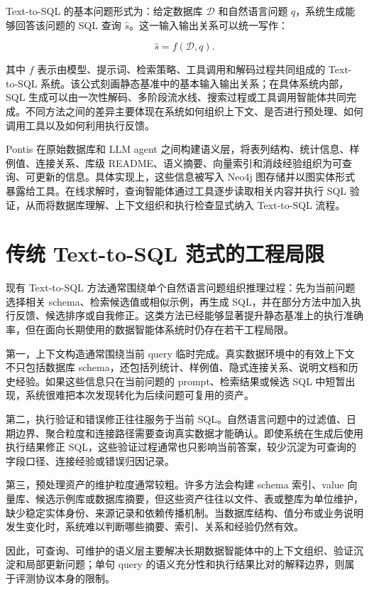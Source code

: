 \documentclass[
    bachelor,
    pdflinks,
]{xjtuthesis}
\begin{document}
Text-to-SQL 的基本问题形式为：给定数据库 $\mathcal{D}$ 和自然语言问题 $q$，系统生成能够回答该问题的 SQL 查询 $\hat{s}$。这一输入输出关系可以统一写作：

\begin{equation}
\hat{s} = f(\mathcal{D}, q) .
\end{equation}

其中 $f$ 表示由模型、提示词、检索策略、工具调用和解码过程共同组成的 Text-to-SQL 系统。该公式刻画静态基准中的基本输入输出关系；在具体系统内部，SQL 生成可以由一次性解码、多阶段流水线、搜索过程或工具调用智能体共同完成。不同方法之间的差异主要体现在系统如何组织上下文、是否进行预处理、如何调用工具以及如何利用执行反馈。

Pontis 在原始数据库和 LLM agent 之间构建语义层，将表列结构、统计信息、样例值、连接关系、库级 README、语义摘要、向量索引和消歧经验组织为可查询、可更新的信息。具体实现上，这些信息被写入 Neo4j 图存储并以图实体形式暴露给工具。在线求解时，查询智能体通过工具逐步读取相关内容并执行 SQL 验证，从而将数据库理解、上下文组织和执行检查显式纳入 Text-to-SQL 流程。

\section{传统 Text-to-SQL 范式的工程局限}

现有 Text-to-SQL 方法通常围绕单个自然语言问题组织推理过程：先为当前问题选择相关 schema、检索候选值或相似示例，再生成 SQL，并在部分方法中加入执行反馈、候选排序或自我修正。这类方法已经能够显著提升静态基准上的执行准确率，但在面向长期使用的数据智能体系统时仍存在若干工程局限。

第一，上下文构造通常围绕当前 query 临时完成。真实数据环境中的有效上下文不只包括数据库 schema，还包括列统计、样例值、隐式连接关系、说明文档和历史经验。如果这些信息只在当前问题的 prompt、检索结果或候选 SQL 中短暂出现，系统很难把本次发现转化为后续问题可复用的资产。

第二，执行验证和错误修正往往服务于当前 SQL。自然语言问题中的过滤值、日期边界、聚合粒度和连接路径需要查询真实数据才能确认。即使系统在生成后使用执行结果修正 SQL，这些验证过程通常也只影响当前答案，较少沉淀为可查询的字段口径、连接经验或错误归因记录。

第三，预处理资产的维护粒度通常较粗。许多方法会构建 schema 索引、value 向量库、候选示例库或数据库摘要，但这些资产往往以文件、表或整库为单位维护，缺少稳定实体身份、来源记录和依赖传播机制。当数据库结构、值分布或业务说明发生变化时，系统难以判断哪些摘要、索引、关系和经验仍然有效。

因此，可查询、可维护的语义层主要解决长期数据智能体中的上下文组织、验证沉淀和局部更新问题；单句 query 的语义充分性和执行结果比对的解释边界，则属于评测协议本身的限制。
\end{document}
